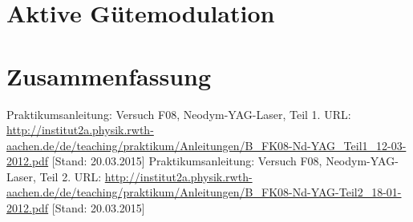 \documentclass{../Misc/MontavonLaTeX/Montavon}
\begin{document}
\section{Aktive Gütemodulation}

\section{Zusammenfassung}

\newpage
\begin{thebibliography}{xxxx}
 Praktikumsanleitung:
Versuch F08, Neodym-YAG-Laser, Teil 1. URL: \url{http://institut2a.physik.rwth-aachen.de/de/teaching/praktikum/Anleitungen/B_FK08-Nd-YAG_Teil1_12-03-2012.pdf} [Stand: 20.03.2015]
 Praktikumsanleitung:
Versuch F08, Neodym-YAG-Laser, Teil 2. URL: \url{http://institut2a.physik.rwth-aachen.de/de/teaching/praktikum/Anleitungen/B_FK08-Nd-YAG-Teil2_18-01-2012.pdf} [Stand: 20.03.2015]
\end{thebibliography}
\end{document}
